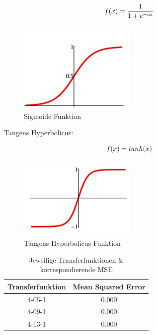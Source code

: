 \begin{equation}\formelentry{Sigmoide Funktion}
f(x)= \frac{1}{1+e^{-cx}}
\end{equation}

\begin{figure}[htbp]
\centering
		\includegraphics[width=0.5\textwidth]{Sigmoid.PNG}
	\caption{Sigmoide Funktion}
	\label{fig:Sigmoide Funktion}
\end{figure}

Tangens Hyperbolicus:

\begin{equation}\formelentry{Tanh Funktion}
f(x)= tanh(x)
\end{equation}

\begin{figure}[htbp]
\centering
		\includegraphics[width=0.5\textwidth]{tanh.PNG}
	\caption{Tangens Hyperbolicus Funktion}
	\label{fig:Tangens Hyperbolicus Funktion}
\end{figure}

\begin{table}
  \centering
  \begin{tabular}{|c|c|}
  \hline 
  \rule[0ex]{0pt}{2.5ex} Transferfunktion & Mean Squared Error \\ 
  \hline 
  \rule[0ex]{0pt}{2.5ex} 4-05-1 & 0.000 \\ 
  \hline 
  \rule[0ex]{0pt}{2.5ex} 4-09-1 & 0.000 \\ 
  \hline 
  \rule[0ex]{0pt}{2.5ex} 4-13-1 & 0.000 \\ 
  \hline 
  \end{tabular} 
  \caption{Jeweilige Transferfunktionen \& korrespondierende MSE}
  \label{tab:tab2}
\end{table}

